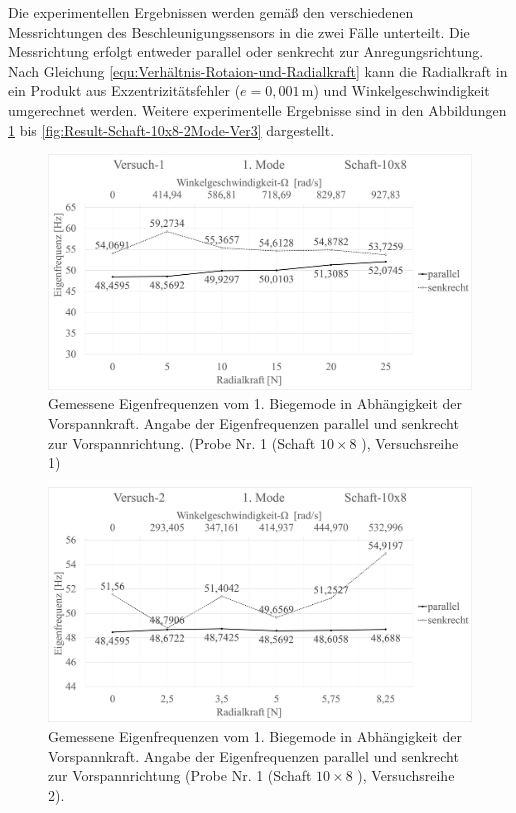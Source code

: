 	Die experimentellen Ergebnissen werden gemäß den verschiedenen Messrichtungen des Beschleunigungssensors in die zwei Fälle unterteilt. Die Messrichtung erfolgt entweder parallel oder senkrecht zur Anregungsrichtung. Nach Gleichung \ref{equ:Verhältnis-Rotaion-und-Radialkraft} kann die Radialkraft in ein Produkt aus Exzentrizitätsfehler ($ e=0,001\,\text{m}$) und Winkelgeschwindigkeit umgerechnet werden. Weitere experimentelle Ergebnisse sind in den Abbildungen \ref{fig:Result-Schaft-10x8-1Mode-Ver1} bis \ref{fig:Result-Schaft-10x8-2Mode-Ver3} dargestellt.
	
	\begin{figure}[H]
		\centering
		\includegraphics[width=0.93\linewidth, height=0.33\textheight]{Ergebnisse/Schaft_10x8_1Mode_ver1} 
		\caption{Gemessene Eigenfrequenzen vom 1. Biegemode in Abhängigkeit der Vorspannkraft. Angabe der Eigenfrequenzen parallel und senkrecht zur Vorspannrichtung. (Probe Nr. 1 (Schaft $ 10\times8 $ ), Versuchsreihe 1)}
		\label{fig:Result-Schaft-10x8-1Mode-Ver1}
	\end{figure}

	\begin{figure}[H]
		\centering
		\includegraphics[width=0.95\linewidth, height=0.36\textheight]{Ergebnisse/Schaft_10x8_1Mode_ver2}
		\caption{Gemessene Eigenfrequenzen vom 1. Biegemode in Abhängigkeit der Vorspannkraft. Angabe der Eigenfrequenzen parallel und senkrecht zur Vorspannrichtung (Probe Nr. 1 (Schaft $ 10\times8 $ ), Versuchsreihe 2).}
		\label{fig:Result-Schaft-10x8-1Mode-Ver2}
	\end{figure}

